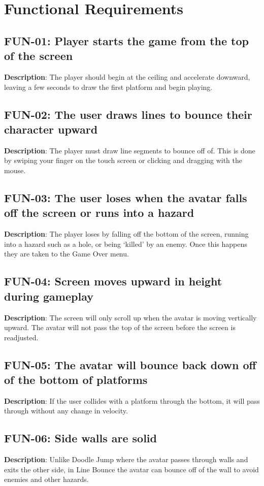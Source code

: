 \chapter{Functional Requirements}
\section{FUN-01: Player starts the game from the top of the screen}
\textbf{Description}: The player should begin at the ceiling and accelerate
downward, leaving a few seconds to draw the first platform and begin
playing.
\section{FUN-02: The user draws lines to bounce their character upward}
\textbf{Description}: The player must draw line segments to bounce
off of. This is done by swiping your finger on the touch screen or
clicking and dragging with the mouse.
\section{FUN-03: The user loses when the avatar falls off the screen or runs
into a hazard}
\textbf{Description}: The player loses by falling off the bottom of
the screen, running into a hazard such as a hole, or being \textquoteleft{}killed\textquoteright{}
by an enemy. Once this happens they are taken to the Game Over menu.
\section{FUN-04: Screen moves upward in height during gameplay}
\textbf{Description}: The screen will only scroll up when the avatar
is moving vertically upward. The avatar will not pass the top of the
screen before the screen is readjusted.
\section{FUN-05: The avatar will bounce back down off of the bottom of platforms}
\textbf{Description}: If the user collides with a platform through
the bottom, it will pass through without any change in velocity.
\section{FUN-06: Side walls are solid}
\textbf{Description}: Unlike Doodle Jump where the avatar passes through
walls and exits the other side, in Line Bounce the avatar can bounce
off of the wall to avoid enemies and other hazards.
